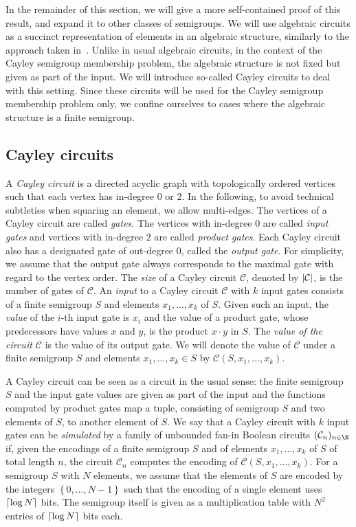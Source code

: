 \documentclass{toc}
\newcommand{\abs}[1]{\ensuremath\left|#1\right|}
\newcommand{\ceil}[1]{\ensuremath\left\lceil#1\right\rceil}
\newcommand{\os}[1]{\ensuremath{\left\{#1\right\}}}
\renewcommand{\C}{\ensuremath{\mathcal{C}}}
\newcommand{\SCSM}{Cayley semigroup membership}
\newcommand{\SCSMP}{{\SCSM} problem}
\begin{document}
In the remainder of this section, we will give a more self-contained proof of
this result, and expand it to other classes of semigroups.
%
We will use algebraic circuits as a succinct representation of elements in an
algebraic structure, %
similarly  %
to the approach taken in~\cite{BabaiS84}.
%
Unlike in usual algebraic circuits, in the context of the {\SCSMP}, the
algebraic structure is not fixed but given as part of the input.
%
We will introduce so-called Cayley circuits to deal with this setting.
%
Since these circuits will be used for the {\SCSMP} only, we confine ourselves
to cases where the algebraic structure is a finite semigroup.

\subsection{Cayley circuits}

A \emph{Cayley circuit} is a directed acyclic graph with topologically ordered
vertices such that each vertex has in-degree $0$ or $2$.
%
In the following, to avoid technical subtleties when squaring an element, we
allow multi-edges.
%
The vertices of a Cayley circuit are called \emph{gates}. The vertices with
in-degree $0$ are called \emph{input gates} and vertices with in-degree $2$ are
called \emph{product gates}. Each Cayley circuit also has a designated gate of
out-degree $0$, called the \emph{output gate}. For simplicity, we assume that
the output gate always corresponds to the maximal gate with regard to the
vertex order.
%
The \emph{size} of a Cayley circuit $\C$, denoted by $\abs{\C}$, is the number
of gates of $\C$.
%
An \emph{input} to a Cayley circuit $\C$ with $k$ input gates consists of a
finite semigroup $S$ and elements $x_1, \dots, x_k$ of $S$.
%
Given such an input, the \emph{value} of the $i$-th input gate is $x_i$ and the
value of a product gate, whose predecessors have values $x$ and $y$, is the
product $x \cdot y$ in $S$. The \emph{value of the circuit $\C$} is the value
of its output gate.
%
We will denote the value of $\C$ under a finite semigroup $S$ and elements
$x_1, \dots, x_k \in S$ by $\C(S, x_1, \dots, x_k)$.

A Cayley circuit can be seen as a circuit in the usual sense: the finite
semigroup $S$ and the input gate values are given as part of the input and the
functions computed by product gates map a tuple, consisting of semigroup $S$
and two elements of $S$, to another element of $S$.
%
We say that a Cayley circuit with $k$ input gates can be \emph{simulated} by a
family of unbounded fan-in Boolean circuits $(\C_n)_{n \in \N}$ if, given the
encodings of a finite semigroup $S$ and of elements $x_1, \dots, x_k$ of $S$ of
total length $n$, the circuit $\C_n$ computes the encoding of $\C(S, x_1,
\dots, x_k)$.
%
For a semigroup $S$ with $N$ elements, we assume that the elements of $S$ are
encoded by the integers $\os{0, \dots, N-1}$ such that the encoding of a single
element uses $\ceil{\log N}$ bits. The semigroup itself is given as a
multiplication table with $N^2$ entries of $\ceil{\log N}$ bits each.
\end{document}
